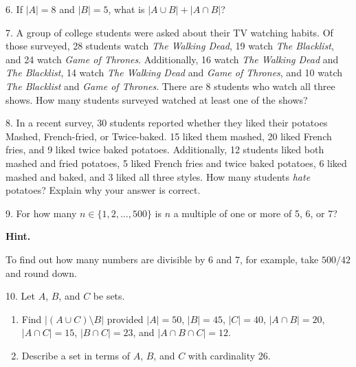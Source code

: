 \documentclass[10pt,]{book}
\theoremstyle{plain}
\theoremstyle{definition}
\numberwithin{equation}{chapter}
\newcommand{\card}[1]{\left| #1 \right|}
\begin{document}
\begin{exerciselist}
\par\smallskip
\item[6.]\hypertarget{exercise-48}{}
          If \(\card{A} = 8\) and \(\card{B} = 5\), what is \(\card{A \cup B} + \card{A \cap B}\)?
\par\smallskip
\item[7.]\hypertarget{exercise-49}{}
          A group of college students were asked about their TV watching habits. Of those surveyed, 28 students watch \emph{The Walking Dead}, 19 watch \emph{The Blacklist}, and 24 watch \emph{Game of Thrones}. Additionally, 16 watch \emph{The Walking Dead} and \emph{The Blacklist}, 14 watch \emph{The Walking Dead} and \emph{Game of Thrones}, and 10 watch \emph{The Blacklist} and \emph{Game of Thrones}. There are 8 students who watch all three shows. How many students surveyed watched at least one of the shows?
\par\smallskip
\item[8.]\hypertarget{exercise-50}{}
          In a recent survey, 30 students reported whether they liked their potatoes Mashed, French-fried, or Twice-baked. 15 liked them mashed, 20 liked French fries, and 9 liked twice baked potatoes. Additionally, 12 students liked both mashed and fried potatoes, 5 liked French fries and twice baked potatoes, 6 liked mashed and baked, and 3 liked all three styles. How many students
          \emph{hate} potatoes? Explain why your answer is correct.
\par\smallskip
\item[9.]\hypertarget{exercise-51}{}
          For how many \(n \in \{1,2, \ldots, 500\}\) is \(n\) a multiple of one or more of 5, 6, or 7?
\par\smallskip
\par\smallskip
\noindent\textbf{Hint.}\hypertarget{hint-4}{}\quad

          To find out how many numbers are divisible by 6 and 7, for example, take \(500/42\) and round down.
\item[10.]\hypertarget{exercise-52}{} Let \(A\), \(B\), and \(C\) be sets.
          \leavevmode%
\begin{enumerate}[label=(\alph*)]
\item\hypertarget{li-202}{}
              Find \(\card{(A \cup C)\setminus B}\) provided \(\card{A} = 50\), \(\card{B} = 45\), \(\card{C} = 40\), \(\card{A\cap B} = 20\), \(\card{A \cap C} = 15\), \(\card{B \cap C} = 23\), and \(\card{A \cap B \cap C} = 12\).
\item\hypertarget{li-203}{}
              Describe a set in terms of \(A\), \(B\), and \(C\) with cardinality 26.
\end{enumerate}


\end{exerciselist}
\end{document}
